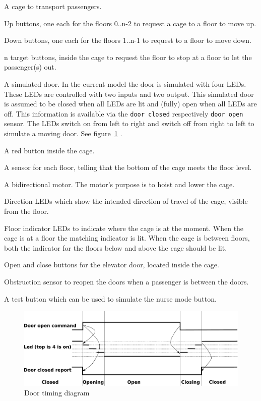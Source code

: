 \vspace{7mm}
\begin{Enumerate}
\item A cage to transport passengers.
\item Up buttons, one each for the floors 0..n-2 to request a cage to
  a floor to move up.
\item Down buttons, one each for the floors 1..n-1 to request to a
  floor to move down.
\item n target buttons, inside the cage to request the floor to stop
  at a floor to let the passenger(s) out.
\item A simulated door. In the current model the door is simulated
  with four LEDs. These LEDs are controlled with two inputs and two
  output. This simulated door is assumed to be closed when all LEDs
  are lit and (fully) open when all LEDs are off. This information is
  available via the \texttt{door closed} respectively \texttt{door open} sensor. The LEDs switch on
  from left to right and switch off from right to left to simulate a
  moving door. See figure~\ref{fig:doortiming}
  .
\item A red button inside the cage.
\item A sensor for each floor, telling that the bottom of the cage
  meets the floor level.
 \item A bidirectional motor. The motor's purpose is to hoist and
  lower the cage.
\item Direction LEDs which show the intended direction of travel of
  the cage, visible from the floor.
\item Floor indicator LEDs to indicate where the cage is at the
  moment. When the cage is at a floor the matching indicator is
  lit. When the cage is between floors, both the indicator for the
  floors below and above the cage should be lit.
\item Open and close buttons for the elevator door, located inside the
  cage.
\item Obstruction sensor to reopen the doors when a passenger is
  between the doors.
\item A test button which can be used to simulate the nurse mode button.
\end{Enumerate}

\begin{figure}[htbp]
  \includegraphics[width=\textwidth]{figures/doorsim}
  \caption{\label{fig:doortiming}Door timing diagram}
\end{figure}

